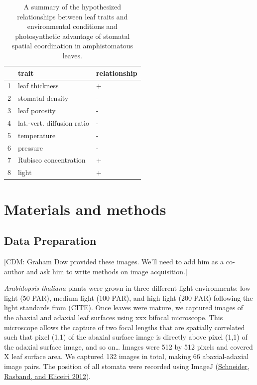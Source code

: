 \documentclass[12pt,halfline,a4paper,]{ouparticle}
\begin{document}
\begin{table}[ht]
\centering
\begin{tabular}{rll}
  \hline
 & trait & relationship \\ 
  \hline
1 & leaf thickness & + \\ 
  2 & stomatal density & - \\ 
  3 & leaf porosity & - \\ 
  4 & lat.-vert. diffusion ratio & - \\ 
  5 & temperature & - \\ 
  6 & pressure & - \\ 
  7 & Rubisco concentration & + \\ 
  8 & light & + \\ 
   \hline
\end{tabular}
\caption{A summary of the hypothesized relationships between leaf traits and environmental conditions and photosynthetic advantage of stomatal spatial coordination in amphistomatous leaves.} 
\label{tab:hypotheses}
\end{table}

\hypertarget{materials-and-methods}{%
\section{Materials and methods}\label{materials-and-methods}}

\hypertarget{data-preparation}{%
\subsection{Data Preparation}\label{data-preparation}}

{[}CDM: Graham Dow provided these images. We'll need to add him as a
co-author and ask him to write methods on image acquisition.{]}

\emph{Arabidopsis thaliana} plants were grown in three different light
environments: low light (50 PAR), medium light (100 PAR), and high light
(200 PAR) following the light standards from (CITE). Once leaves were
mature, we captured images of the abaxial and adaxial leaf surfaces
using xxx bifocal microscope. This microscope allows the capture of two
focal lengths that are spatially correlated such that pixel (1,1) of the
abaxial surface image is directly above pixel (1,1) of the adaxial
surface image, and so on\ldots{} Images were 512 by 512 pixels and
covered X leaf surface area. We captured 132 images in total, making 66
abaxial-adaxial image pairs. The position of all stomata were recorded
using ImageJ (\protect\hyperlink{ref-schneider_nih_2012}{Schneider,
Rasband, and Eliceiri 2012}).
\end{document}
